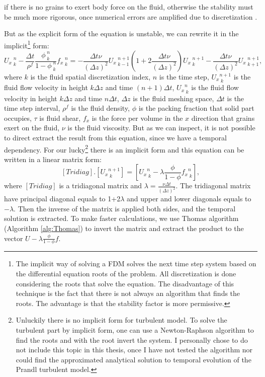 if there is no grains to exert body force on the fluid, otherwise the stability must be much more rigorous, once numerical errors are amplified due to discretization \cite{Transferencia_de_calor_e_mecanica_dos_fluidos_computacional, Numerical_Methods_for_Scientists_and_Engineers, Numerical_Recipes, Numerical_Solution_of_Partial_Differential_Equations}.

    But as the explicit form of the equation is unstable, we can rewrite it in the implicit\footnote{The implicit way of solving a FDM solves the next time step system based on the differential equation roots of the problem. All discretization is done considering the roots that solve the equation. The disadvantage of this technique is the fact that there is not always an algorithm that finds the roots. The advantage is that the stability factor is more permissive.} form:
\begin{equation}
    {U_{x}}_{\;k}^{\;n} -\frac{\Delta t}{\rho^f}\frac{\phi_{\;k}^{\;n}}{1-\phi_{\;k}^{\;n}}{f_x}_{\;k}^{\;n} = -\frac{\Delta t \nu}{\left(\Delta z\right)^2}{U_{x}}_{\;k-1}^{\;n+1} (1+2\frac{\Delta t \nu}{\left(\Delta z\right)^2}){U_{x}}_{\;k}^{\;n+1} -\frac{\Delta t \nu}{\left(\Delta z\right)^2}{U_{x}}_{\;k+1}^{\;n+1},
    \label{equ:fluido_discreto_implicito}
\end{equation}
where $k$ is the fluid spatial discretization index, $n$ is the time step, ${U_x}_{\;k}^{n+1}$ is the fluid flow velocity in height $k \Delta z$ and time $(n+1)\Delta t$, ${U_x}_{\;k}^{n}$ is the fluid flow velocity in height $k \Delta z$ and time $n\Delta t$, $\Delta z$ is the fluid meshing space, $\Delta t$ is the time step interval, $\rho^f$ is the fluid density, $\phi$ is the packing fraction that solid part occupies, $\tau$ is fluid shear, $f_x$ is the force per volume in the $x$ direction that grains exert on the fluid, $\nu$ is the fluid viscosity. But as we can inspect, it is not possible to direct extract the result from this equation, since we have a temporal dependency. For our lucky\footnote{Unluckily there is no implicit form for turbulent model. To solve the turbulent part by implicit form, one can use a Newton-Raphson algorithm to find the roots and with the root invert the system. I personally chose to do not include this topic in this thesis, once I have not tested the algorithm nor could find the approximated analytical solution to temporal evolution of the Prandl turbulent model.} there is an implicit form and this equation can be written in a linear matrix form:
\begin{equation}
    \left[Tridiag\right].\left[{U_x}_{\;k}^{n+1}\right] = \left[{U_x}_{\;k}^{n} -\lambda \frac{\phi}{1-\phi} {f_x}_{\;k}^{n}\right],
\end{equation}
where $\left[Tridiag\right]$ is a tridiagonal matrix and $\lambda = \frac{\nu \Delta t}{\left(\Delta z\right)^2}$. The tridiagonal matrix have principal diagonal equals to 1+2$\lambda$ and upper and lower diagonals equals to $-\lambda$. Then the inverse of the matrix is applied both sides, and the temporal solution is extracted. To make faster calculations, we use Thomas algorithm (Algorithm \ref{alg:Thomas}) to invert the matrix and extract the product to the vector $U-\lambda \frac{\phi}{1-\phi}f$.

